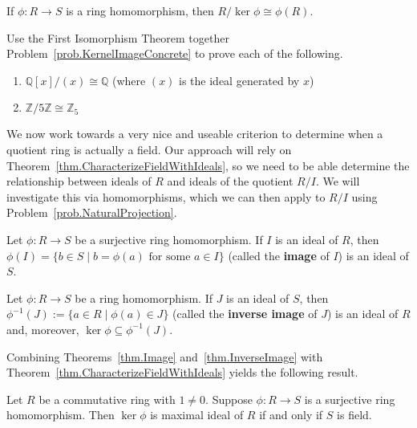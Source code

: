 \begin{theorem}\label{thm.FirstIsoRings}
If $\phi:R\to S$ is a ring homomorphism, then  $R/\ker \phi\cong \phi(R)$.
\end{theorem}

\begin{problem}
Use the First Isomorphism Theorem together Problem~\ref{prob.KernelImageConcrete} to prove each of the following. 
\begin{enumerate}
\item $\mathbb{Q}[x]/(x) \cong \mathbb{Q}$ (where $(x)$ is the ideal generated by $x$)
\item $\mathbb{Z}/5\mathbb{Z} \cong \mathbb{Z}_5$
\end{enumerate}
\end{problem}

We now work towards a very nice and useable criterion to determine when a quotient ring is actually a field. Our approach will rely on Theorem~\ref{thm.CharacterizeFieldWithIdeals}, so we need to be able determine the relationship between ideals of $R$ and ideals of the quotient $R/I$. We will investigate this via homomorphisms, which we can then apply to $R/I$ using Problem~\ref{prob.NaturalProjection}.

\begin{theorem}\label{thm.Image}
Let $\phi:R\to S$ be a surjective ring homomorphism. If $I$ is an ideal of $R$, then $\phi(I)=\{b\in S\mid b=\phi(a) \text{ for some $a\in I$}\}$ (called the \textbf{image} of $I$) is an ideal of $S$.
\end{theorem}

\begin{theorem}\label{thm.InverseImage}
Let $\phi:R\to S$ be a ring homomorphism. If $J$ is an ideal of $S$, then $\phi^{-1}(J) := \{a\in R\mid\phi(a) \in J\}$ (called the \textbf{inverse image} of $J$) is an ideal of $R$ and, moreover,  $\ker\phi \subseteq \phi^{-1}(J)$.
\end{theorem}

Combining Theorems~\ref{thm.Image} and~\ref{thm.InverseImage} with Theorem~\ref{thm.CharacterizeFieldWithIdeals} yields the following result.

\begin{theorem}
Let $R$ be a commutative ring with $1\neq0$. Suppose $\phi:R\to S$ is a surjective ring homomorphism. Then $\ker\phi$ is maximal ideal of $R$ if and only if $S$ is field.
\end{theorem}

